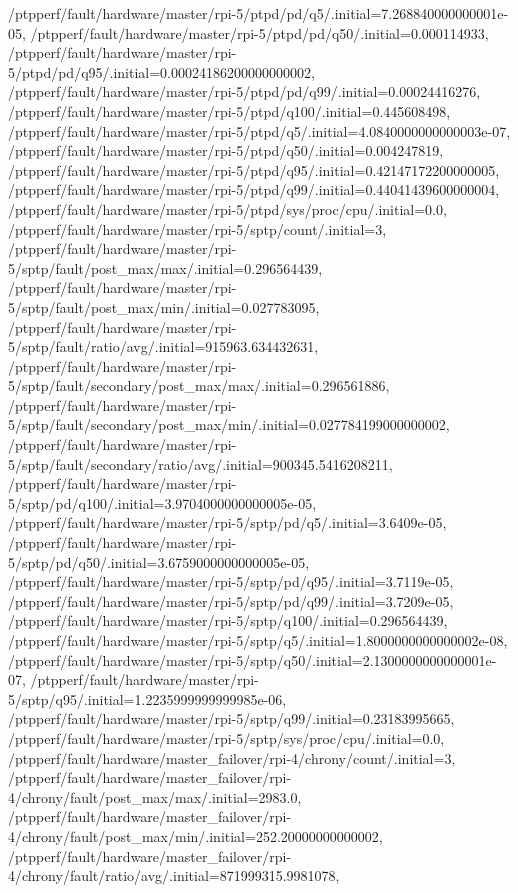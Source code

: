 {    /ptpperf/fault/hardware/master/rpi-5/ptpd/pd/q5/.initial=7.268840000000001e-05,
    /ptpperf/fault/hardware/master/rpi-5/ptpd/pd/q50/.initial=0.000114933,
    /ptpperf/fault/hardware/master/rpi-5/ptpd/pd/q95/.initial=0.00024186200000000002,
    /ptpperf/fault/hardware/master/rpi-5/ptpd/pd/q99/.initial=0.00024416276,
    /ptpperf/fault/hardware/master/rpi-5/ptpd/q100/.initial=0.445608498,
    /ptpperf/fault/hardware/master/rpi-5/ptpd/q5/.initial=4.0840000000000003e-07,
    /ptpperf/fault/hardware/master/rpi-5/ptpd/q50/.initial=0.004247819,
    /ptpperf/fault/hardware/master/rpi-5/ptpd/q95/.initial=0.42147172200000005,
    /ptpperf/fault/hardware/master/rpi-5/ptpd/q99/.initial=0.44041439600000004,
    /ptpperf/fault/hardware/master/rpi-5/ptpd/sys/proc/cpu/.initial=0.0,
    /ptpperf/fault/hardware/master/rpi-5/sptp/count/.initial=3,
    /ptpperf/fault/hardware/master/rpi-5/sptp/fault/post_max/max/.initial=0.296564439,
    /ptpperf/fault/hardware/master/rpi-5/sptp/fault/post_max/min/.initial=0.027783095,
    /ptpperf/fault/hardware/master/rpi-5/sptp/fault/ratio/avg/.initial=915963.634432631,
    /ptpperf/fault/hardware/master/rpi-5/sptp/fault/secondary/post_max/max/.initial=0.296561886,
    /ptpperf/fault/hardware/master/rpi-5/sptp/fault/secondary/post_max/min/.initial=0.027784199000000002,
    /ptpperf/fault/hardware/master/rpi-5/sptp/fault/secondary/ratio/avg/.initial=900345.5416208211,
    /ptpperf/fault/hardware/master/rpi-5/sptp/pd/q100/.initial=3.9704000000000005e-05,
    /ptpperf/fault/hardware/master/rpi-5/sptp/pd/q5/.initial=3.6409e-05,
    /ptpperf/fault/hardware/master/rpi-5/sptp/pd/q50/.initial=3.6759000000000005e-05,
    /ptpperf/fault/hardware/master/rpi-5/sptp/pd/q95/.initial=3.7119e-05,
    /ptpperf/fault/hardware/master/rpi-5/sptp/pd/q99/.initial=3.7209e-05,
    /ptpperf/fault/hardware/master/rpi-5/sptp/q100/.initial=0.296564439,
    /ptpperf/fault/hardware/master/rpi-5/sptp/q5/.initial=1.8000000000000002e-08,
    /ptpperf/fault/hardware/master/rpi-5/sptp/q50/.initial=2.1300000000000001e-07,
    /ptpperf/fault/hardware/master/rpi-5/sptp/q95/.initial=1.2235999999999985e-06,
    /ptpperf/fault/hardware/master/rpi-5/sptp/q99/.initial=0.23183995665,
    /ptpperf/fault/hardware/master/rpi-5/sptp/sys/proc/cpu/.initial=0.0,
    /ptpperf/fault/hardware/master_failover/rpi-4/chrony/count/.initial=3,
    /ptpperf/fault/hardware/master_failover/rpi-4/chrony/fault/post_max/max/.initial=2983.0,
    /ptpperf/fault/hardware/master_failover/rpi-4/chrony/fault/post_max/min/.initial=252.20000000000002,
    /ptpperf/fault/hardware/master_failover/rpi-4/chrony/fault/ratio/avg/.initial=871999315.9981078,
}
